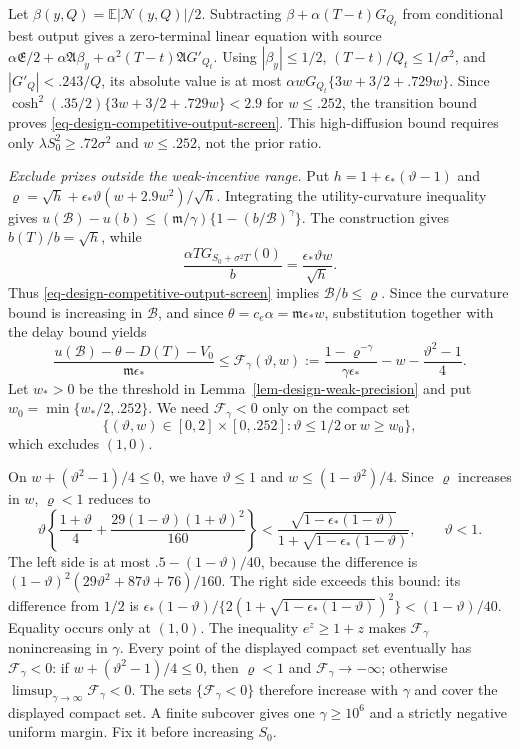 \documentclass[mnsc]{informs3}
\begin{document}
\begin{APPENDICES}
{Let $\beta(y,Q)=\mathbb E|\mathcal N(y,Q)|/2$.
Subtracting $\beta+\alpha(T-t)G_{Q_t}$ from conditional best output
gives a zero-terminal linear equation with source
$\alpha {\mathfrak E}/2+\alpha {\mathfrak A}\beta_y+\alpha^2(T-t){\mathfrak A}G'_{Q_t}$.
Using $|\beta_y|\leq1/2$, $(T-t)/Q_t\leq1/\sigma^2$, and
$|G'_Q|<.243/Q$, its absolute value is at most
$\alpha wG_{Q_t}\{3w+3/2+.729w\}$.
Since $\cosh^2(.35/2)\{3w+3/2+.729w\}<2.9$ for $w\leq.252$,
the transition bound proves \eqref{eq-design-competitive-output-screen}.
This high-diffusion bound requires only
$\lambda S_0^2\geq.72\sigma^2$ and $w\leq.252$, not the prior ratio.

\emph{Exclude prizes outside the weak-incentive range.}
Put $h=1+{\epsilon_*}({\vartheta}-1)$ and
${\varrho}=\sqrt h+{\epsilon_*}{\vartheta}(w+2.9w^2)/\sqrt h$.
Integrating the utility-curvature inequality gives
$u(\mathcal B)-u(b)\leq({\mathfrak m}/\gamma)\{1-(b/\mathcal B)^\gamma\}$.
The construction gives $b(T)/b=\sqrt h$, while
\[
\frac{\alpha T G_{S_0+\sigma^2T}(0)}b
=\frac{{\epsilon_*}{\vartheta}w}{\sqrt h}.
\]
Thus \eqref{eq-design-competitive-output-screen} implies
$\mathcal B/b\leq {\varrho}$. Since the curvature bound is increasing in
$\mathcal B$, and since $\theta=c_e\alpha={\mathfrak m}{\epsilon_*}w$, substitution together
with the delay bound yields
\begin{equation}\label{eq-design-joint-exit-screen}
\frac{u(\mathcal B)-\theta-D(T)-V_0}{{\mathfrak m}{\epsilon_*}}
\leq \mathscr F_\gamma({\vartheta},w):=\frac{1-{\varrho}^{-\gamma}}{\gamma {\epsilon_*}}
-w-\frac{{\vartheta}^2-1}{4}.
\end{equation}
Let $w_*>0$ be the threshold in Lemma~\ref{lem-design-weak-precision}
and put $w_0=\min\{w_*/2,.252\}$.
We need $\mathscr F_\gamma<0$ only on the compact set
\[
\{({\vartheta},w)\in[0,2]\times[0,.252]:{\vartheta}\leq1/2\ \text{or}\ w\geq w_0\},
\]
which excludes $(1,0)$.

On $w+({\vartheta}^2-1)/4\leq0$, we have ${\vartheta}\leq1$ and
$w\leq(1-{\vartheta}^2)/4$. Since ${\varrho}$ increases in $w$, ${\varrho}<1$
reduces to
\[
{\vartheta}\left\{\frac{1+{\vartheta}}{4}+\frac{29(1-{\vartheta})(1+{\vartheta})^2}{160}\right\}
<\frac{\sqrt{1-{\epsilon_*}(1-{\vartheta})}}{1+\sqrt{1-{\epsilon_*}(1-{\vartheta})}},\qquad {\vartheta}<1.
\]
The left side is at most $.5-(1-{\vartheta})/40$, because the difference is
$(1-{\vartheta})^2(29{\vartheta}^2+87{\vartheta}+76)/160$.
The right side exceeds this bound: its difference from $1/2$ is
${\epsilon_*}(1-{\vartheta})/\{2(1+\sqrt{1-{\epsilon_*}(1-{\vartheta})})^2\}<(1-{\vartheta})/40$.
Equality occurs only at $(1,0)$.
The inequality $e^z\geq1+z$ makes $\mathscr F_\gamma$ nonincreasing in $\gamma$.
Every point of the displayed compact set eventually has $\mathscr F_\gamma<0$:
if $w+({\vartheta}^2-1)/4\leq0$, then ${\varrho}<1$ and $\mathscr F_\gamma\to-\infty$;
otherwise $\limsup_{\gamma\to\infty}\mathscr F_\gamma<0$.
The sets $\{\mathscr F_\gamma<0\}$ therefore increase with $\gamma$ and cover the
displayed compact set. A finite subcover gives one
$\gamma\geq10^6$ and a strictly negative uniform margin.
Fix it before increasing $S_0$.

}
\end{APPENDICES}
\end{document}
